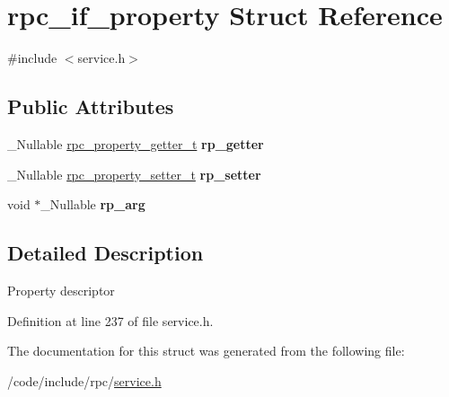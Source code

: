 \hypertarget{structrpc__if__property}{}\section{rpc\+\_\+if\+\_\+property Struct Reference}
\label{structrpc__if__property}


{\ttfamily \#include $<$service.\+h$>$}

\subsection*{Public Attributes}
\begin{DoxyCompactItemize}
\item 
\+\_\+\+Nullable \hyperlink{service_8h_ab438f0c33f3f3876f1c9a23d62134f16}{rpc\+\_\+property\+\_\+getter\+\_\+t} {\bfseries rp\+\_\+getter}\hypertarget{structrpc__if__property_a2b294c7fed3665f1a58020040ec13aee}{}\label{structrpc__if__property_a2b294c7fed3665f1a58020040ec13aee}

\item 
\+\_\+\+Nullable \hyperlink{service_8h_aa8b38d8ab3bafe79a96edaebafe13b8d}{rpc\+\_\+property\+\_\+setter\+\_\+t} {\bfseries rp\+\_\+setter}\hypertarget{structrpc__if__property_a02e1f9e6e5680714278ed6dd67987d67}{}\label{structrpc__if__property_a02e1f9e6e5680714278ed6dd67987d67}

\item 
void $\ast$\+\_\+\+Nullable {\bfseries rp\+\_\+arg}\hypertarget{structrpc__if__property_a81d2953a7a4bdff1775330c29992546b}{}\label{structrpc__if__property_a81d2953a7a4bdff1775330c29992546b}

\end{DoxyCompactItemize}


\subsection{Detailed Description}
Property descriptor 

Definition at line 237 of file service.\+h.



The documentation for this struct was generated from the following file\+:\begin{DoxyCompactItemize}
\item 
/code/include/rpc/\hyperlink{service_8h}{service.\+h}\end{DoxyCompactItemize}
